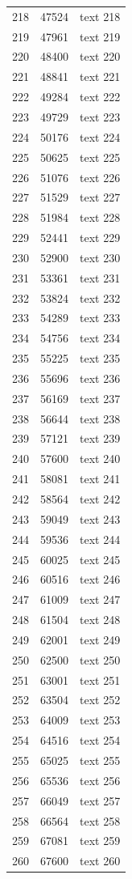 \documentclass[10pt]{article}
\begin{document}
\begin{longtable}{rrl}
218&47524&text 218\\
219&47961&text 219\\
220&48400&text 220\\
221&48841&text 221\\
222&49284&text 222\\
223&49729&text 223\\
224&50176&text 224\\
225&50625&text 225\\
226&51076&text 226\\
227&51529&text 227\\
228&51984&text 228\\
229&52441&text 229\\
230&52900&text 230\\
231&53361&text 231\\
232&53824&text 232\\
233&54289&text 233\\
234&54756&text 234\\
235&55225&text 235\\
236&55696&text 236\\
237&56169&text 237\\
238&56644&text 238\\
239&57121&text 239\\
240&57600&text 240\\
241&58081&text 241\\
242&58564&text 242\\
243&59049&text 243\\
244&59536&text 244\\
245&60025&text 245\\
246&60516&text 246\\
247&61009&text 247\\
248&61504&text 248\\
249&62001&text 249\\
250&62500&text 250\\
251&63001&text 251\\
252&63504&text 252\\
253&64009&text 253\\
254&64516&text 254\\
255&65025&text 255\\
256&65536&text 256\\
257&66049&text 257\\
258&66564&text 258\\
259&67081&text 259\\
260&67600&text 260\\

\end{longtable}
\end{document}
